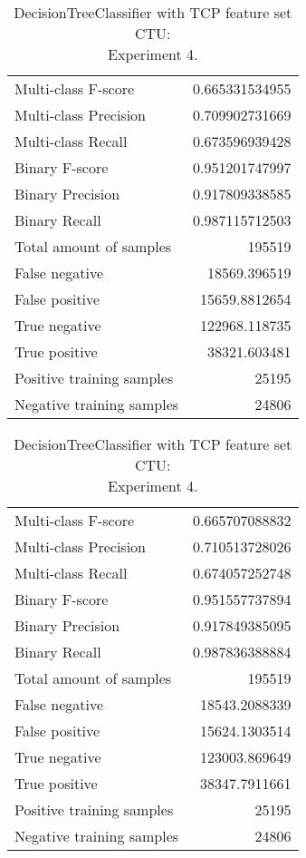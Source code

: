 \begin{table}[H]
\begin{minipage}{0.5\textwidth}
\caption{DecisionTreeClassifier with TCP feature set CTU: \\Experiment 3.}
\centering
\begin{tabular}{l r}
\toprule
Multi-class F-score & 0.665331534955 \\
Multi-class Precision & 0.709902731669 \\
Multi-class Recall & 0.673596939428 \\
\midrule
Binary F-score & 0.951201747997 \\
Binary Precision & 0.917809338585 \\
Binary Recall & 0.987115712503 \\
\midrule
Total amount of samples & 195519 \\
False negative & 18569.396519 \\
False positive & 15659.8812654 \\
True negative & 122968.118735 \\
True positive & 38321.603481 \\
\midrule
Positive training samples & 25195 \\
Negative training samples & 24806 \\
\bottomrule
\end{tabular}
\end{minipage}
\hfillx
\begin{minipage}{0.5\textwidth}
\caption{DecisionTreeClassifier with TCP feature set CTU: \\Experiment 4.}
\centering
\begin{tabular}{l r}
\toprule
Multi-class F-score & 0.665707088832 \\
Multi-class Precision & 0.710513728026 \\
Multi-class Recall & 0.674057252748 \\
\midrule
Binary F-score & 0.951557737894 \\
Binary Precision & 0.917849385095 \\
Binary Recall & 0.987836388884 \\
\midrule
Total amount of samples & 195519 \\
False negative & 18543.2088339 \\
False positive & 15624.1303514 \\
True negative & 123003.869649 \\
True positive & 38347.7911661 \\
\midrule
Positive training samples & 25195 \\
Negative training samples & 24806 \\
\bottomrule
\end{tabular}
\end{minipage}
\end{table}
